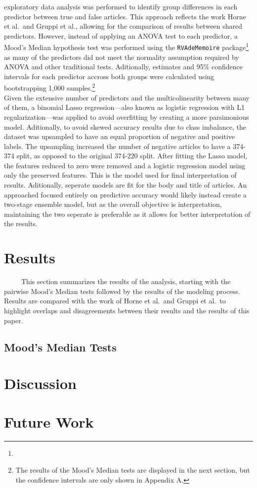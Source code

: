 \documentclass[12pt]{article}
\begin{document}
exploratory data analysis was performed to identify group differences in
each predictor between true and false articles. This approach reflects
the work Horne et al.~and Gruppi et al., allowing for the comparison of
results between shared predictors. However, instead of applying an ANOVA
test to each predictor, a Mood's Median hypothesis test was performed
using the \texttt{RVAdeMemoire} package\footnote{} as many of the
predictors did not meet the normality assumption required by ANOVA and
other traditional tests. Aditionally, estimates and 95\% confidence
intervals for each predictor accross both groups were calculated using
bootstrapping 1,000 samples.\footnote{The results of the Mood's Median
  tests are displayed in the next section, but the confidence intervals
  are only shown in Appendix A.}\\
\hspace*{0.333em}\hspace*{0.333em}\hspace*{0.333em}\hspace*{0.333em}\hspace*{0.333em}Given
the extensive number of predictors and the multicolinearity between many
of them, a binomial Lasso regression---also known as logistic regression
with L1 regularization---was applied to avoid overfitting by creating a
more parsimonious model. Aditionally, to avoid skewed accuracy results
due to class imbalance, the dataset was upsampled to have an equal
proportion of negative and positive labels. The upsampling increased the
number of negative articles to have a 374-374 split, as opposed to the
original 374-220 split. After fitting the Lasso model, the features
reduced to zero were removed and a logistic regression model using only
the preserved features. This is the model used for final interpretation
of results. Aditionally, seperate models are fit for the body and title
of articles. An approached focused entirely on predictive accuracy would
likely instead create a two-stage ensemble model, but as the overall
objective is interpretation, maintaining the two seperate is preferable
as it allows for better interpretation of the results.

\section{Results}

~~~~~This section summarizes the results of the analysis, starting with
the pairwise Mood's Median tests followed by the results of the modeling
process. Results are compared with the work of Horne et al.~and Gruppi
et al.~to highlight overlaps and disagreements between their results and
the results of this paper.

\subsection{Mood's Median Tests}

\section{Discussion}

\section{Future Work}



\end{document}
